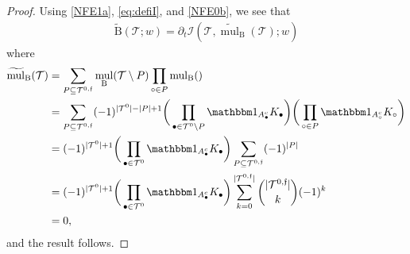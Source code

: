 \documentclass[%
11pt,  reqno]{amsart}
\makeatletter
\newcommand{\5}{\textup{V}}
\newcommand{\ind}{\mathbbm 1}
\newcommand{\wt}{\widetilde}
\newcommand{\dt}{\partial_t}
\theoremstyle{remark}
\newcommand{\bul}{\bullet}
\newcommand{\TT}{\mathcal{T}}
\newcommand{\Tr}{\mathrm{T}}
\newcommand{\ff}{\mathfrak{f}}
\newcommand{\N}{\mathbb{N}}
\DeclareMathOperator{\mul}{mul}
\DeclareMathOperator{\mulB}{mul_{\BB}}
\def\<#1>{\csname MH@symb@#1\endcsname}
\newcommand{\Ical}{\mathcal{I}}
\numberwithin{equation}{section}
\numberwithin{theorem}{section}
\newcommand{\BB}{\mathrm{B}}
\newcommand{\D}{\mathrm{D}}
\makeatother
\begin{document}
\begin{proof}
Using \eqref{NFE1a}, \eqref{eq:defiI}, and \eqref{NFE0b}, we see that
\begin{align}
\wt{\BB}(\TT;w)   = \dt \Ical(\TT, \wt{\mul}_\BB (\TT);w )
\end{align}
where
\begin{align}
\label{wbd1a}
\begin{split}
\wt{\mul}_\BB(\TT)
 &
= \sum_{P\subseteq \TT^{0,\ff}} \mul_{\BB}(\TT\setminus P)
\prod_{\circ \in P} \mulB(\<01>)
\\
&
= \sum_{P\subseteq \TT^{0,\ff}} (-1)^{|\TT^0| - |P| + 1} \bigg( \prod_{\bul \in \TT^0 \setminus P} \ind_{A_\bul^c } K_\bul \bigg) \bigg( \prod_{\circ \in P} \ind_{A_\circ^c} K_\circ \bigg) \\
&
=(-1)^{|\TT^0|+1} \bigg( \prod_{\bul \in \TT^0} \ind_{A_\bul^c} K_\bul \bigg) \sum_{P \subseteq \TT^{0,\ff}} (-1)^{|P|} \\
&
=(-1)^{|\TT^0|+1} \bigg( \prod_{\bul \in \TT^0} \ind_{A_\bul^c} K_\bul \bigg) \sum_{k=0}^{|\TT^{0,\ff}|} \binom{|\TT^{0,\ff}|}{k} (-1)^{k} \\
& =0 ,
\end{split}
\end{align}
and the result follows. \qedhere



\end{proof}
\end{document}

